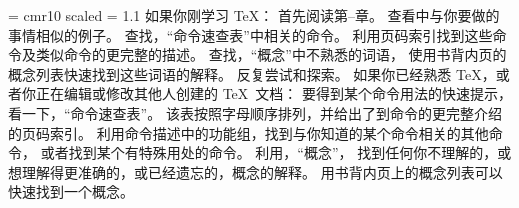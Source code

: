 


{\font\rm = cmr10 scaled \magstephalf \baselineskip = 1.1\baselineskip
如果你刚学习 \TeX ：
\ulist
\li 首先阅读第--章。
\li 查看中与你要做的事情相似的例子。
查找，“命令速查表”中相关的命令。
利用页码索引找到这些命令及类似命令的更完整的描述。
\li 查找，“概念”中不熟悉的词语，
使用书背内页的概念列表快速找到这些词语的解释。
\li 反复尝试和探索。
\endulist
\bigskip
\noindent
如果你已经熟悉 \TeX ，或者你正在编辑或修改其他人创建的 \TeX\ 文档：
\ulist
\li 要得到某个命令用法的快速提示，看一下，“命令速查表”。
该表按照字母顺序排列，并给出了到命令的更完整介绍的页码索引。
\li 利用命令描述中的功能组，找到与你知道的某个命令相关的其他命令，
或者找到某个有特殊用处的命令。
\li 利用，“概念”，
找到任何你不理解的，或想理解得更准确的，或已经遗忘的，概念的解释。
用书背内页上的概念列表可以快速找到一个概念。
\endulist
}
\pagebreak

\byebye
